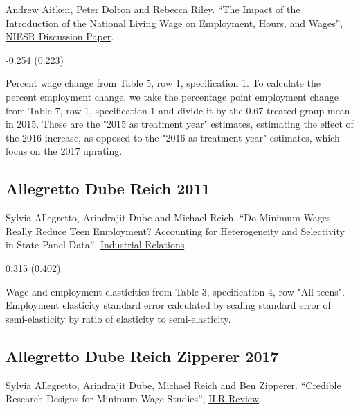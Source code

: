 \noindent Andrew Aitken, Peter Dolton and Rebecca Riley. ``The Impact of the Introduction of the National Living Wage on Employment, Hours, and Wages'', \href{https://www.niesr.ac.uk/wp-content/uploads/2021/10/DP501.pdf}{NIESR Discussion Paper}.

\vspace{0.7em}

 -0.254 (0.223)

\vspace{0.7em}

 Percent wage change from Table 5, row 1, specification 1. To calculate the percent employment change, we take the percentage point employment change from Table 7, row 1, specification 1 and divide it by the 0.67 treated group mean in 2015. These are the "2015 as treatment year" estimates, estimating the effect of the 2016 increase, as opposed to the "2016 as treatment year" estimates, which focus on the 2017 uprating.

\subsection*{Allegretto Dube Reich 2011}
\vspace{-0.7em}

\noindent Sylvia Allegretto, Arindrajit Dube and Michael Reich. ``Do Minimum Wages Really Reduce Teen Employment? Accounting for Heterogeneity and Selectivity in State Panel Data'', \href{https://doi.org/10.1111/j.1468-232X.2011.00634.x}{Industrial Relations}.

\vspace{0.7em}

 0.315 (0.402)

\vspace{0.7em}

 Wage and employment elasticities from Table 3, specification 4, row "All teens". Employment elasticity standard error calculated by scaling standard error of semi-elasticity by ratio of elasticity to semi-elasticity.

\subsection*{Allegretto Dube Reich Zipperer 2017}
\vspace{-0.7em}

\noindent Sylvia Allegretto, Arindrajit Dube, Michael Reich and Ben Zipperer. ``Credible Research Designs for Minimum Wage Studies'', \href{https://doi.org/10.1177/0019793917692788}{ILR Review}.

